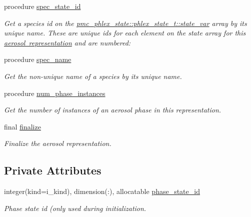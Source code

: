 \begin{DoxyCompactItemize}
procedure \mbox{\hyperlink{structpmc__aero__rep__single__particle_1_1aero__rep__single__particle__t_abc6e9924cb4d910b501d02308109785d}{spec\+\_\+state\+\_\+id}}
\begin{DoxyCompactList}\small\item\em Get a species id on the {\ttfamily \mbox{\hyperlink{structpmc__phlex__state_1_1phlex__state__t_a78835cb552d483ebbfc7a6bc6f756918}{pmc\+\_\+phlex\+\_\+state\+::phlex\+\_\+state\+\_\+t\+::state\+\_\+var}}} array by its unique name. These are unique ids for each element on the state array for this \mbox{\hyperlink{phlex_aero_rep}{aerosol representation}} and are numbered\+: \end{DoxyCompactList}\item 
procedure \mbox{\hyperlink{structpmc__aero__rep__single__particle_1_1aero__rep__single__particle__t_a7f7f0656f7d9c9c6713a8b26f0c7f67f}{spec\+\_\+name}}
\begin{DoxyCompactList}\small\item\em Get the non-\/unique name of a species by its unique name. \end{DoxyCompactList}\item 
procedure \mbox{\hyperlink{structpmc__aero__rep__single__particle_1_1aero__rep__single__particle__t_a8268ef8bd3ca8e76fd1820492d3b8ce8}{num\+\_\+phase\+\_\+instances}}
\begin{DoxyCompactList}\small\item\em Get the number of instances of an aerosol phase in this representation. \end{DoxyCompactList}\item 
final \mbox{\hyperlink{structpmc__aero__rep__single__particle_1_1aero__rep__single__particle__t_a8b15dadc4edee1c9b401c9578e78daf6}{finalize}}
\begin{DoxyCompactList}\small\item\em Finalize the aerosol representation. \end{DoxyCompactList}\end{DoxyCompactItemize}
\subsection*{Private Attributes}
\begin{DoxyCompactItemize}
\item 
integer(kind=i\+\_\+kind), dimension(\+:), allocatable \mbox{\hyperlink{structpmc__aero__rep__single__particle_1_1aero__rep__single__particle__t_af8b5f9b96f449c78b9f43845fbf403c4}{phase\+\_\+state\+\_\+id}}
\begin{DoxyCompactList}\small\item\em Phase state id (only used during initialization. \end{DoxyCompactList}\end{DoxyCompactItemize}
